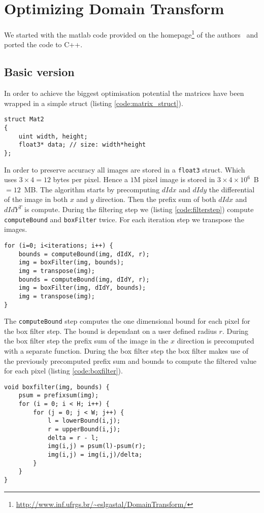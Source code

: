 \section{Optimizing Domain Transform}
We started with the matlab code provided on the homepage\footnote{\url{http://www.inf.ufrgs.br/~eslgastal/DomainTransform/}} of the authors~\cite{GastalOliveira2011DomainTransform} and ported the code to C++. 
\subsection{Basic version}
In order to achieve the biggest optimisation potential the matrices have been wrapped in a simple struct (listing \ref{code:matrix_struct}).
\begin{lstlisting}[caption=Matrix struct,label=code:matrix_struct]
struct Mat2
{
    uint width, height;
    float3* data; // size: width*height
};
\end{lstlisting}
In order to preserve accuracy all images are stored in a \lstinline{float3} struct. Which uses $3\times 4 = 12$ bytes per pixel. Hence a $1$M pixel image is stored in $3\times 4\times 10^6$\ B $=12$\ MB.
The algorithm starts by precomputing $dIdx$ and $dIdy$ the differential of the image in both $x$ and $y$ direction. Then the prefix sum of both $dIdx$ and $dIdY^T$ is compute. 
During the filtering step we (listing \ref{code:filterstep}) compute \lstinline{computeBound} and \lstinline{boxFilter} twice. For each iteration step we transpose the images.
\begin{lstlisting}[caption=Filterstep,label=code:filterstep]
for (i=0; i<iterations; i++) {
    bounds = computeBound(img, dIdX, r);
    img = boxFilter(img, bounds);
    img = transpose(img);
    bounds = computeBound(img, dIdY, r);
    img = boxFilter(img, dIdY, bounds);
    img = transpose(img);
}
\end{lstlisting}
The \lstinline{computeBound} step computes the one dimensional bound for each pixel for the box filter step. The bound is dependant on a user defined radius $r$. 
During the box filter step the prefix sum of the image in the $x$ direction is precomputed with a separate function. During the box filter step the box filter makes use of the previously precomputed prefix sum and bounds to compute the filtered value for each pixel (listing \ref{code:boxfilter}).
\begin{lstlisting}[caption=Boxfilter step, label=code:boxfilter]
void boxfilter(img, bounds) {
    psum = prefixsum(img);
    for (i = 0; i < H; i++) {
        for (j = 0; j < W; j++) {
            l = lowerBound(i,j);
            r = upperBound(i,j);
            delta = r - l;
            img(i,j) = psum(l)-psum(r);
            img(i,j) = img(i,j)/delta;
        }
    }
}
\end{lstlisting}
